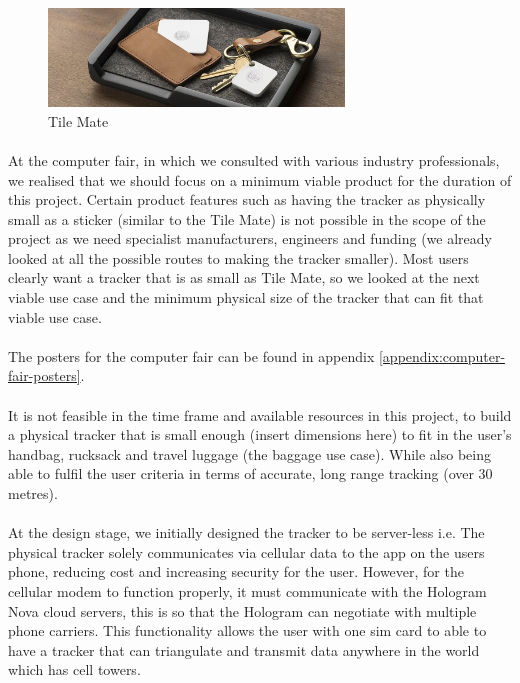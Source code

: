 \documentclass[12pt,a4paper]{article}
\begin{document}
        \begin{figure}[H]
          \centering
          \includegraphics[width=0.7\textwidth]{../assets/design-concept-tile-mate.jpg}
          \caption{Tile Mate}
          \label{fig:Tile Mate}
        \end{figure}
        
        \paragraph{} At the computer fair, in which we consulted with various industry professionals, we realised that we should focus on a minimum viable product for the duration of this project. Certain product features such as having the tracker as physically small as a sticker (similar to the Tile Mate) is not possible in the scope of the project as we need specialist manufacturers, engineers and funding (we already looked at all the possible routes to making the tracker smaller). Most users clearly want a tracker that is as small as Tile Mate, so we looked at the next viable use case and the minimum physical size of the tracker that can fit that viable use case.

        \paragraph{} The posters for the computer fair can be found in appendix \ref{appendix:computer-fair-posters}. 
        
        \paragraph{} It is not feasible in the time frame and available resources in this project, to build a physical tracker that is small enough (insert dimensions here) to fit in the user’s handbag, rucksack and travel luggage (the baggage use case). While also being able to fulfil the user criteria in terms of accurate, long range tracking (over 30 metres).
        
        \paragraph{} At the design stage, we initially designed the tracker to be server-less i.e. The physical tracker solely communicates via cellular data to the app on the users phone, reducing cost and increasing security for the user. However, for the cellular modem to function properly, it must communicate with the Hologram Nova cloud servers, this is so that the Hologram can negotiate with multiple phone carriers. This functionality allows the user with one sim card to able to have a tracker that can triangulate and transmit data anywhere in the world which has cell towers.
        
\end{document}
